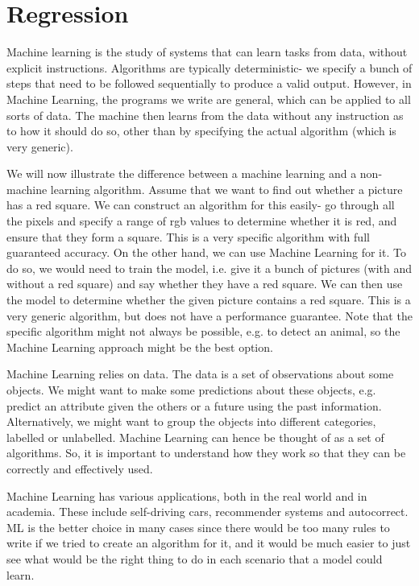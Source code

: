\documentclass[a4paper, openany]{memoir}
\begin{document}
    \chapter{Regression}

    Machine learning is the study of systems that can learn tasks from data, without explicit instructions. Algorithms are typically deterministic- we specify a bunch of steps that need to be followed sequentially to produce a valid output. However, in Machine Learning, the programs we write are general, which can be applied to all sorts of data. The machine then learns from the data without any instruction as to how it should do so, other than by specifying the actual algorithm (which is very generic).

    We will now illustrate the difference between a machine learning and a non-machine learning algorithm. Assume that we want to find out whether a picture has a red square. We can construct an algorithm for this easily- go through all the pixels and specify a range of rgb values to determine whether it is red, and ensure that they form a square. This is a very specific algorithm with full guaranteed accuracy. On the other hand, we can use Machine Learning for it. To do so, we would need to train the model, i.e. give it a bunch of pictures (with and without a red square) and say whether they have a red square. We can then use the model to determine whether the given picture contains a red square. This is a very generic algorithm, but does not have a performance guarantee. Note that the specific algorithm might not always be possible, e.g. to detect an animal, so the Machine Learning approach might be the best option.

    Machine Learning relies on data. The data is a set of observations about some objects. We might want to make some predictions about these objects, e.g. predict an attribute given the others or a future using the past information. Alternatively, we might want to group the objects into different categories, labelled or unlabelled. Machine Learning can hence be thought of as a set of algorithms. So, it is important to understand how they work so that they can be correctly and effectively used.

    Machine Learning has various applications, both in the real world and in academia. These include self-driving cars, recommender systems and autocorrect. ML is the better choice in many cases since there would be too many rules to write if we tried to create an algorithm for it, and it would be much easier to just see what would be the right thing to do in each scenario that a model could learn.
\end{document}

